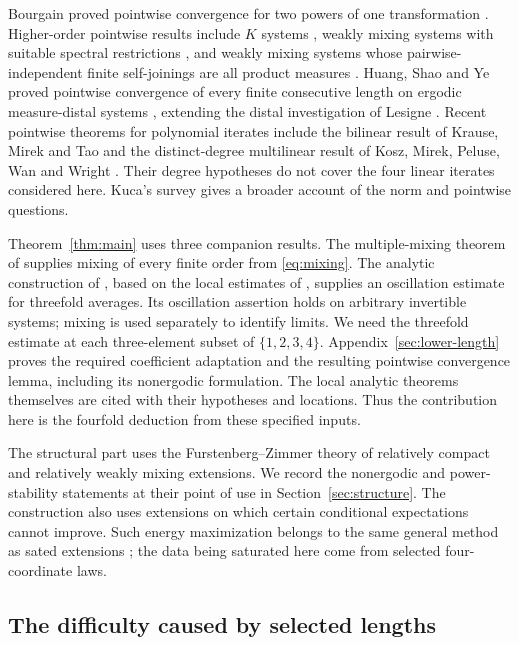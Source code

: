 Bourgain proved pointwise convergence for two powers of one
transformation \cite{Bourgain}. Higher-order pointwise results include
$K$ systems \cite[Theorem~4.2]{DerrienLesigne}, weakly mixing systems
with suitable spectral restrictions \cite{Assani}, and weakly mixing
systems whose pairwise-independent finite self-joinings are all
product measures \cite{GutmanHuangShaoYe}. Huang, Shao and Ye proved
pointwise convergence of every finite consecutive length on ergodic
measure-distal systems \cite[Theorem~C]{HuangShaoYe}, extending the
distal investigation of Lesigne \cite{Lesigne}. Recent pointwise
theorems for polynomial iterates include the bilinear result of
Krause, Mirek and Tao \cite{KrauseMirekTao} and the distinct-degree
multilinear result of Kosz, Mirek, Peluse, Wan and Wright
\cite{KoszMirekPeluseWanWright}. Their degree hypotheses do not cover
the four linear iterates considered here. Kuca's survey \cite{Kuca}
gives a broader account of the norm and pointwise questions.

Theorem~\ref{thm:main} uses three companion results. The multiple-mixing
theorem of \cite[Theorem~1.1]{MixingCompanion} supplies mixing of every finite order
from \eqref{eq:mixing}. The analytic construction of
\cite{TripleCompanion}, based on the local estimates of
\cite{HilbertCompanion}, supplies an oscillation estimate for threefold
averages. Its oscillation assertion holds on arbitrary invertible
systems; mixing is used separately to identify limits. We need the
threefold estimate at each three-element subset of $\{1,2,3,4\}$.
Appendix~\ref{sec:lower-length} proves the required coefficient
adaptation and the resulting pointwise convergence lemma, including its
nonergodic formulation. The local analytic theorems themselves are cited
with their hypotheses and locations. Thus the contribution here is the
fourfold deduction from these specified inputs.

The structural part uses the Furstenberg--Zimmer theory of relatively
compact and relatively weakly mixing extensions. We record the
nonergodic and power-stability statements at their point of use in
Section~\ref{sec:structure}. The construction also uses extensions on
which certain conditional expectations cannot improve. Such energy
maximization belongs to the same general method as sated extensions
\cite{Austin}; the data being saturated here come from selected
four-coordinate laws.

\subsection*{The difficulty caused by selected lengths}

